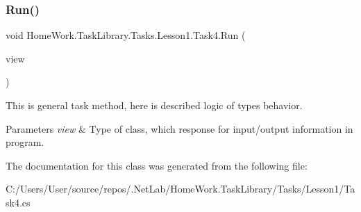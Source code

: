 \subsubsection{\texorpdfstring{Run()}{Run()}}
{\footnotesize\ttfamily void Home\+Work.\+Task\+Library.\+Tasks.\+Lesson1.\+Task4.\+Run (\begin{DoxyParamCaption}\item[{I\+Information}]{view }\end{DoxyParamCaption})}



This is general task method, here is described logic of types behavior. 


\begin{DoxyParams}{Parameters}
{\em view} & Type of class, which response for input/output information in program.\\
\hline
\end{DoxyParams}


The documentation for this class was generated from the following file\+:\begin{DoxyCompactItemize}
\item 
C\+:/\+Users/\+User/source/repos/.\+Net\+Lab/\+Home\+Work.\+Task\+Library/\+Tasks/\+Lesson1/Task4.\+cs\end{DoxyCompactItemize}
